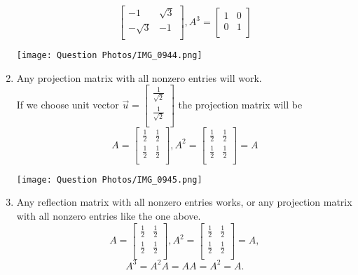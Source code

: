 \begin{SaveQuestion}
\begin{enumerate}
$$\begin{bmatrix}
	-1 & \sqrt{3} \\
	-\sqrt{3} & -1 \\
	\end{bmatrix},
        A^3 = 
        \begin{bmatrix} 
	1 & 0 \\
	0 & 1 \\
	\end{bmatrix}$$
 \begin{center}
        \texttt{[image: Question Photos/IMG\_0944.png]}
        \end{center}
    \item Any projection matrix with all nonzero entries will work. \\
        If we choose unit vector $\vec{u} = 
        \begin{bmatrix} 
	\frac{1}{\sqrt{2}} \\
	\frac{1}{\sqrt{2}} \\
	\end{bmatrix}$
        the projection matrix will be 
        $$A = 
        \begin{bmatrix} 
	\frac{1}{2} & \frac{1}{2} \\
	\frac{1}{2} & \frac{1}{2} \\
	\end{bmatrix},
        A^2 = 
        \begin{bmatrix} 
	\frac{1}{2} & \frac{1}{2} \\
	\frac{1}{2} & \frac{1}{2} \\
	\end{bmatrix} = A$$
    \begin{center}
        \texttt{[image: Question Photos/IMG\_0945.png]}
        \end{center}
    \item  Any reflection matrix with all nonzero entries works, or any projection matrix with all nonzero entries like the one above. \\
        $$A = 
        \begin{bmatrix} 
	\frac{1}{2} & \frac{1}{2} \\
	\frac{1}{2} & \frac{1}{2} \\
	\end{bmatrix},
        A^2 = 
        \begin{bmatrix} 
	\frac{1}{2} & \frac{1}{2} \\
	\frac{1}{2} & \frac{1}{2} \\
	\end{bmatrix} = A,$$
        $$A^3 = A^2A = AA = A^2 = A.$$

\end{enumerate}
\end{SaveQuestion}
